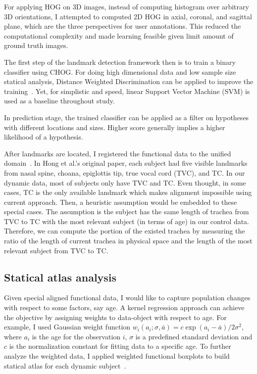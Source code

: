For applying HOG on 3D images, instead of computing histogram over arbitrary 3D orientations, I attempted to computed 2D HOG in axial, coronal, and sagittal plane, which are the three perspectives for user annotations.
This reduced the computational complexity and made learning feasible given limit amount of ground truth images.

The first step of the landmark detection framework then is to train a binary classifier using CHOG.
For doing high dimensional data and low sample size statical analysis, Distance Weighted Discrimination can be applied to improve the training~\cite{marron2007distance}.
Yet, for simplistic and speed, linear Support Vector Machine (SVM) is used as a baseline throughout study.

In prediction stage, the trained classifier can be applied as a filter on hypotheses with different locations and sizes.
Higher score generally implies a higher likelihood of a hypothesis.

After landmarks are located, I registered the functional data to the unified domain~\cite{ramsay2006functional}.
In Hong et al.'s original paper, each subject had five visible landmarks from nasal spine, choana, epiglottis tip, true vocal cord (TVC), and TC.
In our dynamic data, most of subjects only have TVC and TC.
Even thought, in some cases, TC is the only available landmark which makes alignment impossible using current approach.
Then, a heuristic assumption would be embedded to these special cases.
The assumption is the subject has the same length of trachea from TVC to TC with the most relevant subject (in terms of age) in our control data.
Therefore, we can compute the portion of the existed trachea by measuring the ratio of the length of current trachea in physical space and the length of the most relevant subject from TVC to TC.

\subsection{Statical atlas analysis}
\label{sec:statical_atlas_analysis}
Given special aligned functional data, I would like to capture population changes with respect to some factors, say age.
A kernel regression approach can achieve the objective by assigning weights to data-object with respect to age.
For example, I used Gaussian weight function $w_i(a_i; \sigma, \bar{a}) = c\exp{(a_i-\bar{a})/2\sigma^2}$, where $a_i$ is the age for the observation $i$, $\sigma$ is a predefined standard deviation and $c$ is the normalization constant for fitting data to a specific age.
To further analyze the weighted data, I applied weighted functional boxplots to build statical atlas for each dynamic subject~\cite{hong2013weighted}.

